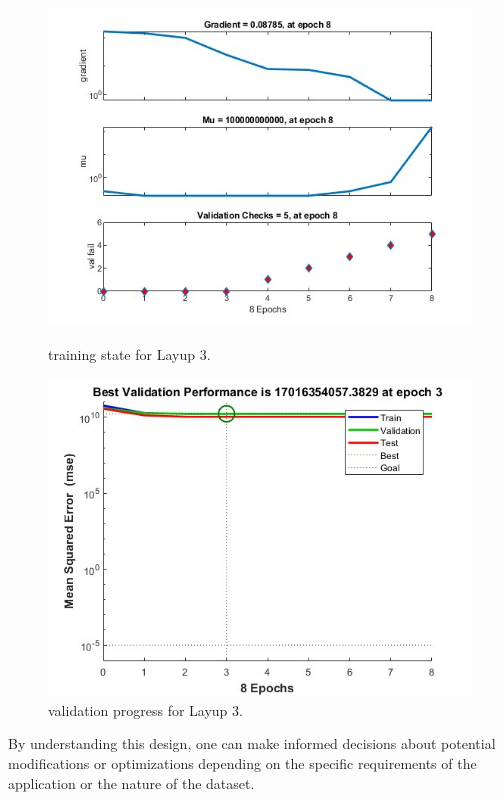 \begin{figure}[h]
    \centering
    \begin{minipage}{0.45\textwidth}
        \centering
        \includegraphics[width=\linewidth]{train_3.jpg}
        \caption{training state for Layup 3.}
    \end{minipage}
    \hfill
    \begin{minipage}{0.45\textwidth}
        \centering
        \includegraphics[width=\linewidth]{train_33.jpg}
        \caption{validation progress for Layup 3.}
    \end{minipage}
\end{figure}
By understanding this design, one can make informed decisions about potential modifications or optimizations depending on the specific requirements of the application or the nature of the dataset.
